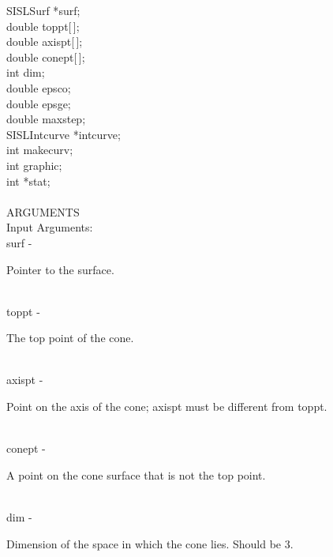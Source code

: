                 \>\>    SISLSurf        \>      *{\fov surf};\\
                \>\>    double  \>      {\fov toppt}[\,];\\
                \>\>    double  \>      {\fov axispt}[\,];\\
                \>\>    double  \>      {\fov conept}[\,];\\
                \>\>    int     \>      {\fov dim};\\
                \>\>    double  \>      {\fov epsco};\\
                \>\>    double  \>      {\fov epsge};\\
                \>\>    double  \>      {\fov maxstep};\\
                \>\>    SISLIntcurve\>  *{\fov intcurve};\\
                \>\>    int     \>      {\fov makecurv};\\
                \>\>    int     \>      {\fov graphic};\\
                \>\>    int     \>      *{\fov stat};\\
\\
ARGUMENTS\\
        \>Input Arguments:\\
        \>\>    {\fov surf}\> - \>      \begin{minipg2}
                                Pointer to the surface.
                                \end{minipg2}\\
        \>\>    {\fov toppt}\> - \>     \begin{minipg2}
                                The top point of the cone.
                                \end{minipg2}\\
        \>\>    {\fov axispt}\> - \>    \begin{minipg2}
                                Point on the axis of the cone; axispt must be different from toppt.
                                \end{minipg2}\\[0.3ex]
        \>\>    {\fov conept}\> - \>    \begin{minipg2}
                                A point on the cone surface that is not the top
                                point.
                                \end{minipg2} \\[0.3ex]
        \>\>    {\fov dim}\> - \>       \begin{minipg2}
                                Dimension of the space in which the cone lies.
                                Should be 3.
                                \end{minipg2}\\[0.8ex]
